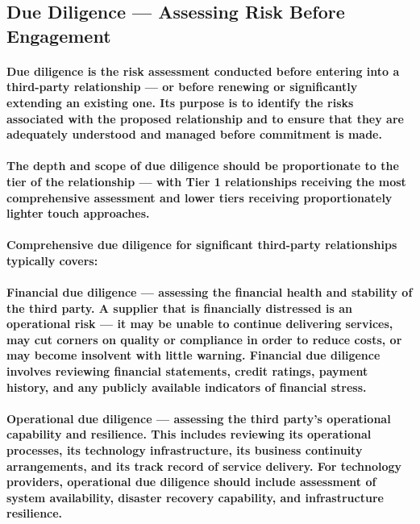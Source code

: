 \subsection{Due Diligence — Assessing Risk Before Engagement}
\paragraph{\textbf{Due diligence} is the risk assessment conducted before entering into a third-party relationship — or before renewing or significantly extending an existing one. Its purpose is to identify the risks associated with the proposed relationship and to ensure that they are adequately understood and managed before commitment is made.}
\paragraph{The depth and scope of due diligence should be proportionate to the tier of the relationship — with Tier 1 relationships receiving the most comprehensive assessment and lower tiers receiving proportionately lighter touch approaches.}
\paragraph{Comprehensive due diligence for significant third-party relationships typically covers:}
\paragraph{\textbf{Financial due diligence} — assessing the financial health and stability of the third party. A supplier that is financially distressed is an operational risk — it may be unable to continue delivering services, may cut corners on quality or compliance in order to reduce costs, or may become insolvent with little warning. Financial due diligence involves reviewing financial statements, credit ratings, payment history, and any publicly available indicators of financial stress.}
\paragraph{\textbf{Operational due diligence} — assessing the third party's operational capability and resilience. This includes reviewing its operational processes, its technology infrastructure, its business continuity arrangements, and its track record of service delivery. For technology providers, operational due diligence should include assessment of system availability, disaster recovery capability, and infrastructure resilience.}
